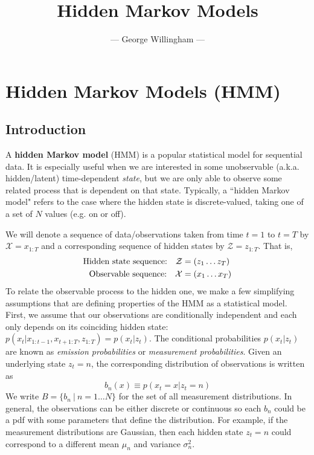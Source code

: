 \documentclass[onecolumn]{gwclass}
\title{\vspace{-0.5in}\Huge\bfseries \color{\stylecolor}Hidden Markov Models}
\author{--- George Willingham ---}
\date{}
\begin{document}
	\maketitle
	
	\section{Hidden Markov Models (HMM)}
	\subsection{Introduction}
	A \textbf{hidden Markov model} (HMM) is a popular statistical model for sequential data. It is especially useful when we are interested in some unobservable (a.k.a. hidden/latent) time-dependent \emph{state}, but we are only able to observe some related process that is dependent on that state. Typically, a ``hidden Markov model" refers to the case where the hidden state is discrete-valued, taking one of a set of $N$ values (e.g. on or off).
	
	We will denote a sequence of data/observations taken from time $t=1$ to $t=T$ by $\mathcal{X}=x_{1:T}$ and a corresponding sequence of hidden states by $\mathcal{Z}=z_{1:T}$. That is,
	\begin{align*}
		\text{\normalfont{Hidden state sequence:}}\quad\mathcal{Z} &= (z_1\dots z_T) \\
		\text{\normalfont{Observable sequence:}}\quad\mathcal{X} &= (x_1\dots x_T)
	\end{align*}
	To relate the observable process to the hidden one, we make a few simplifying assumptions that are defining properties of the HMM as a statistical model. First, we assume that our observations are conditionally independent and each only depends on its coinciding hidden state: $ p(x_t|x_{1:t-1}, x_{t+1:T}, z_{1:T}) = p(x_t|z_t) $.
	The conditional probabilities $p(x_t|z_t)$ are known as \emph{emission probabilities} or \emph{measurement probabilities}. Given an underlying state $z_t=n$, the corresponding distribution of observations is written as
	$$ b_n(x)\equiv p(x_t=x|z_t=n) $$
	We write $B=\{b_n\:|\:n=1\dots N\}$ for the set of all measurement distributions. In general, the observations can be either discrete or continuous so each $b_n$ could be a pdf with some parameters that define the distribution. For example, if the measurement distributions are Gaussian, then each hidden state $z_t=n$ could correspond to a different mean $\mu_n$ and variance $\sigma_n^2$.
	
\end{document}
